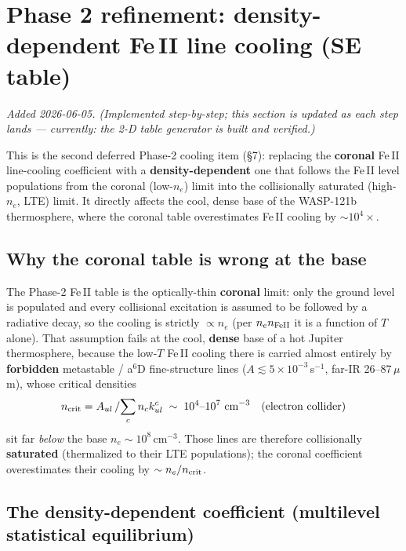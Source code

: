 \documentclass[english,a4paper]{kiseon_memo}
\begin{document}
\section{Phase 2 refinement: density-dependent Fe\,II line cooling (SE table)}

\emph{Added 2026-06-05. (Implemented step-by-step; this section is updated as each
step lands --- currently: the 2-D table generator is built and verified.)}

This is the second deferred Phase-2 cooling item (\S7): replacing the
\textbf{coronal} Fe\,II line-cooling coefficient with a \textbf{density-dependent}
one that follows the Fe\,II level populations from the coronal (low-\(n_e\)) limit
into the collisionally saturated (high-\(n_e\), LTE) limit. It directly affects the
cool, dense base of the WASP-121b thermosphere, where the coronal table
overestimates Fe\,II cooling by \(\sim10^{4}\times\).

\subsection{Why the coronal table is wrong at the base}

The Phase-2 Fe\,II table is the optically-thin \textbf{coronal} limit: only the
ground level is populated and every collisional excitation is assumed to be
followed by a radiative decay, so the cooling is strictly \(\propto n_e\) (per
\(n_e n_{\rm FeII}\) it is a function of \(T\) alone). That assumption fails at the
cool, \textbf{dense} base of a hot Jupiter thermosphere, because the low-\(T\)
Fe\,II cooling there is carried almost entirely by \textbf{forbidden} metastable /
a\(^6\)D fine-structure lines (\(A\lesssim5\times10^{-3}\)\,s\(^{-1}\), far-IR
26--87\,\(\mu\)m), whose critical densities
\[
  n_{\rm crit} = A_{ul}\,/\!\sum_c n_c k_{ul}^c \;\sim\; 10^4\text{--}10^7\ {\rm cm^{-3}}
  \quad(\text{electron collider})
\]
sit far \emph{below} the base \(n_e\sim10^{8}\)\,cm\(^{-3}\). Those lines are
therefore collisionally \textbf{saturated} (thermalized to their LTE populations);
the coronal coefficient overestimates their cooling by \(\sim n_e/n_{\rm crit}\).

\subsection{The density-dependent coefficient (multilevel statistical equilibrium)}
\end{document}
